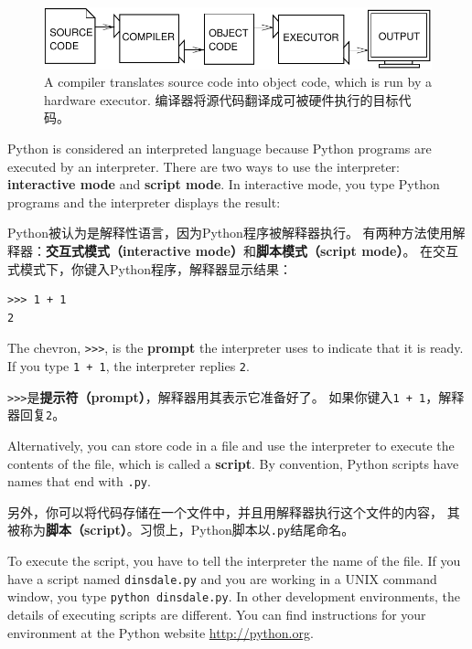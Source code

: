 \documentclass[10pt]{book}
\begin{document}
\begin{CJK}{UTF8}{gbsn}
\begin{figure}
\centerline
{\includegraphics[scale=0.9]{figs/compile.pdf}}
\caption{A compiler translates source code into object code, which is
run by a hardware executor.
编译器将源代码翻译成可被硬件执行的目标代码。}
\label{fig.compile}
\end{figure}

Python is considered an interpreted language because Python programs
are executed by an interpreter.  There are two ways to use the
interpreter: {\bf interactive mode} and {\bf script mode}. In
interactive mode, you type Python programs and the interpreter displays
the result:

Python被认为是解释性语言，因为Python程序被解释器执行。
有两种方法使用解释器：{\bf 交互式模式（interactive mode）}和{\bf 脚本模式（script mode）}。
在交互式模式下，你键入Python程序，解释器显示结果：

\begin{verbatim}
>>> 1 + 1
2
\end{verbatim}
%
The chevron, \verb">>>", is the
{\bf prompt} the interpreter uses to indicate that it is ready.  If
you type {\tt 1 + 1}, the interpreter replies {\tt 2}.

\verb">>>"是{\bf 提示符（prompt）}，解释器用其表示它准备好了。
如果你键入{\tt 1 + 1}，解释器回复{\tt 2}。

Alternatively, you can store code in a file and use the interpreter to
execute the contents of the file, which is called a {\bf script}.  By
convention, Python scripts have names that end with {\tt .py}.

另外，你可以将代码存储在一个文件中，并且用解释器执行这个文件的内容，
其被称为{\bf 脚本（script）}。习惯上，Python脚本以{\tt .py}结尾命名。

To execute the script, you have to tell the interpreter the name of
the file.  If you have a script named {\tt dinsdale.py} and you are
working in a UNIX command window, you type {\tt python
dinsdale.py}.  In other development environments, the details of
executing scripts are different.  You can find instructions for
your environment at the Python website \url{http://python.org}.


\end{CJK}
\end{document}
